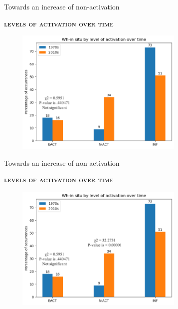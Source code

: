 \documentclass[lesson_slides]{subfiles}
\begin{document}
\begin{frame}[c]{Towards an increase of non-activation}

    \textbf{\textsc{levels of activation over time}}
    \begin{center}
        \includegraphics[width=10cm, height=6cm]{images/activationschi.png}
    \end{center}
  
\end{frame}
\begin{frame}[c]{Towards an increase of non-activation}

    \textbf{\textsc{levels of activation over time}}
    \begin{center}
        \includegraphics[width=10cm, height=6cm]{images/activationschi2.png}
    \end{center}
  
\end{frame}
\end{document}
